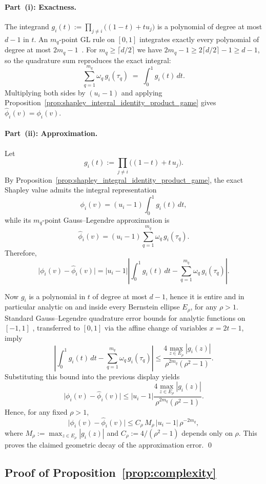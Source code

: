 \paragraph{Part~(i): Exactness.}
The integrand $g_i(t):=\prod_{j\neq i}\bigl((1-t)+tu_j\bigr)$ is a polynomial
of degree at most $d-1$ in $t$.
An $m_q$-point GL rule on $[0,1]$ integrates exactly every polynomial of degree
at most $2m_q-1$~\citep{davis1984methods}.
For $m_q\ge\lceil d/2\rceil$ we have $2m_q-1\ge 2\lceil d/2\rceil-1\ge d-1$,
so the quadrature sum reproduces the exact integral:
\[
\sum_{q=1}^{m_q}\omega_q\,g_i(\tau_q)
\;=\;
\int_0^1 g_i(t)\,dt.
\]
Multiplying both sides by $(u_i-1)$ and applying
Proposition~\ref{prop:shapley_integral_identity_product_game} gives
$\widehat{\phi}_i(v)=\phi_i(v)$.

\paragraph{Part~(ii): Approximation.}
Let
\[
g_i(t):=\prod_{j\neq i}\bigl((1-t)+t\,u_j\bigr).
\]
By Proposition~\ref{prop:shapley_integral_identity_product_game}, the exact
Shapley value admits the integral representation
\[
\phi_i(v)
=
(u_i-1)\int_0^1 g_i(t)\,dt,
\]
while its \(m_q\)-point Gauss--Legendre approximation is
\[
\widehat{\phi}_i(v)
=
(u_i-1)\sum_{q=1}^{m_q}\omega_q\,g_i(\tau_q).
\]
Therefore,
\[
\bigl|\phi_i(v)-\widehat{\phi}_i(v)\bigr|
=
|u_i-1|
\left|
\int_0^1 g_i(t)\,dt
-
\sum_{q=1}^{m_q}\omega_q\,g_i(\tau_q)
\right|.
\]

Now \(g_i\) is a polynomial in \(t\) of degree at most \(d-1\), hence it is
entire and in particular analytic on and inside every Bernstein ellipse
\(E_\rho\), for any \(\rho>1\). Standard Gauss--Legendre quadrature error
bounds for analytic functions on \([-1,1]\) \citep[Thm.~19.3]{trefethen2013atap},
transferred to \([0,1]\) via the affine change of variables \(x=2t-1\), imply
\[
\left|
\int_0^1 g_i(t)\,dt
-
\sum_{q=1}^{m_q}\omega_q\,g_i(\tau_q)
\right|
\le
\frac{4\max_{z\in E_\rho}|g_i(z)|}{\rho^{2m_q}(\rho^2-1)}.
\]
Substituting this bound into the previous display yields
\[
\bigl|\phi_i(v)-\widehat{\phi}_i(v)\bigr|
\le
|u_i-1|
\frac{4\max_{z\in E_\rho}|g_i(z)|}{\rho^{2m_q}(\rho^2-1)}.
\]
Hence, for any fixed \(\rho>1\),
\[
\bigl|\phi_i(v)-\widehat{\phi}_i(v)\bigr|
\le
C_\rho\,M_\rho\,|u_i-1|\,\rho^{-2m_q},
\]
where $M_\rho:=\max_{z\in E_\rho}|g_i(z)|$ and $C_\rho:=4/(\rho^2-1)$ depends only on $\rho$.
This proves the claimed geometric decay of the approximation error. \qed

\subsection*{Proof of Proposition~\ref{prop:complexity}}

